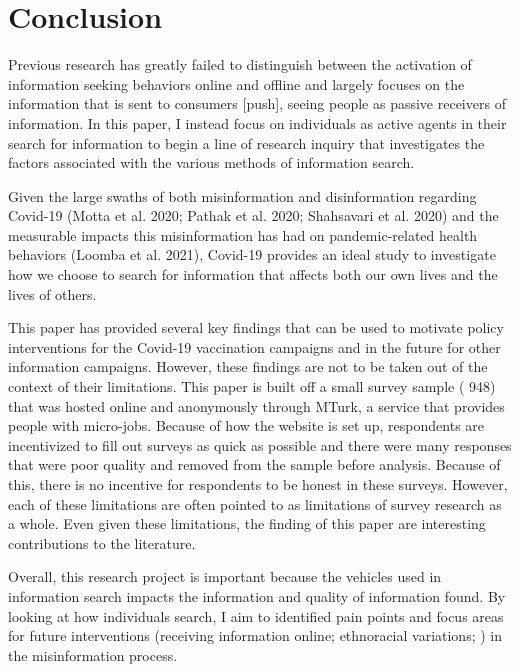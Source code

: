 \hypertarget{conclusion}{%
\section{Conclusion}\label{conclusion}}

Previous research has greatly failed to distinguish between the activation of
information seeking behaviors online and offline and largely focuses on the
information that is sent to consumers {[}push{]}, seeing people as passive receivers
of information. In this paper, I instead focus on individuals as active agents
in their search for information to begin a line of research inquiry that
investigates the factors associated with the various methods of information
search.

Given the large swaths of both misinformation and disinformation regarding
Covid-19 (Motta et al. 2020; Pathak et al. 2020; Shahsavari et al. 2020) and the measurable impacts this
misinformation has had on pandemic-related health behaviors
(Loomba et al. 2021), Covid-19 provides an ideal study to
investigate how we choose to search for information that affects both our own
lives and the lives of others.

This paper has provided several key findings that can be used to motivate policy
interventions for the Covid-19 vaccination campaigns and in the future for other
information campaigns. However, these findings are not to be taken out of the
context of their limitations. This paper is built off a small survey sample (
948) that was hosted online and anonymously through MTurk, a service
that provides people with micro-jobs. Because of how the website is set up,
respondents are incentivized to fill out surveys as quick as possible and there
were many responses that were poor quality and removed from the sample before
analysis. Because of this, there is no incentive for respondents to be honest in
these surveys. However, each of these limitations are often pointed to as
limitations of survey research as a whole. Even given these limitations,
the finding of this paper are interesting contributions to the literature.

Overall, this research project is important because the vehicles used in
information search impacts the information and quality of information found. By
looking at how individuals search, I aim to identified pain points and focus areas
for future interventions (receiving information online; ethnoracial variations; ) in the misinformation process.


